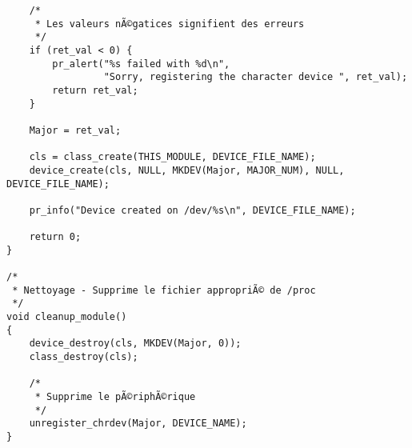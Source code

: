 \documentclass[11pt]{article}
\begin{document}
\begin{verbatim}
    /*
     * Les valeurs nÃ©gatices signifient des erreurs
     */
    if (ret_val < 0) {
        pr_alert("%s failed with %d\n",
                 "Sorry, registering the character device ", ret_val);
        return ret_val;
    }

    Major = ret_val;

    cls = class_create(THIS_MODULE, DEVICE_FILE_NAME);
    device_create(cls, NULL, MKDEV(Major, MAJOR_NUM), NULL, DEVICE_FILE_NAME);

    pr_info("Device created on /dev/%s\n", DEVICE_FILE_NAME);

    return 0;
}

/*
 * Nettoyage - Supprime le fichier appropriÃ© de /proc
 */
void cleanup_module()
{
    device_destroy(cls, MKDEV(Major, 0));
    class_destroy(cls);

    /*
     * Supprime le pÃ©riphÃ©rique
     */
    unregister_chrdev(Major, DEVICE_NAME);
}
\end{verbatim}
\end{document}
